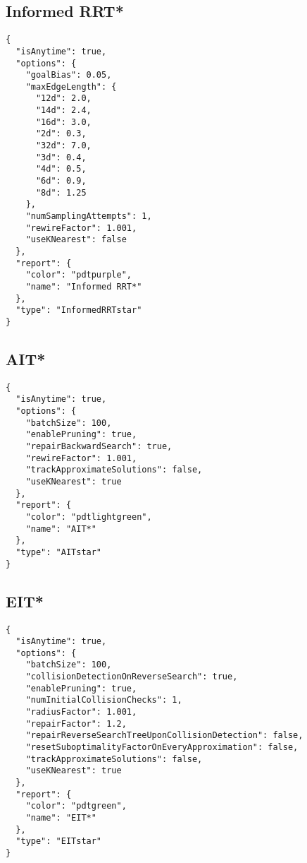 \documentclass[titlepage]{article}
\begin{document}
\begin{appendices}
\subsection{Informed RRT*}\label{sec:defaultInformedRRTstar-configuration}
\begin{lstlisting}
{
  "isAnytime": true,
  "options": {
    "goalBias": 0.05,
    "maxEdgeLength": {
      "12d": 2.0,
      "14d": 2.4,
      "16d": 3.0,
      "2d": 0.3,
      "32d": 7.0,
      "3d": 0.4,
      "4d": 0.5,
      "6d": 0.9,
      "8d": 1.25
    },
    "numSamplingAttempts": 1,
    "rewireFactor": 1.001,
    "useKNearest": false
  },
  "report": {
    "color": "pdtpurple",
    "name": "Informed RRT*"
  },
  "type": "InformedRRTstar"
}\end{lstlisting}
\subsection{AIT*}\label{sec:defaultAITstar-configuration}
\begin{lstlisting}
{
  "isAnytime": true,
  "options": {
    "batchSize": 100,
    "enablePruning": true,
    "repairBackwardSearch": true,
    "rewireFactor": 1.001,
    "trackApproximateSolutions": false,
    "useKNearest": true
  },
  "report": {
    "color": "pdtlightgreen",
    "name": "AIT*"
  },
  "type": "AITstar"
}\end{lstlisting}
\subsection{EIT*}\label{sec:defaultEITstar-configuration}
\begin{lstlisting}
{
  "isAnytime": true,
  "options": {
    "batchSize": 100,
    "collisionDetectionOnReverseSearch": true,
    "enablePruning": true,
    "numInitialCollisionChecks": 1,
    "radiusFactor": 1.001,
    "repairFactor": 1.2,
    "repairReverseSearchTreeUponCollisionDetection": false,
    "resetSuboptimalityFactorOnEveryApproximation": false,
    "trackApproximateSolutions": false,
    "useKNearest": true
  },
  "report": {
    "color": "pdtgreen",
    "name": "EIT*"
  },
  "type": "EITstar"
}\end{lstlisting}
\end{appendices}
\end{document}
